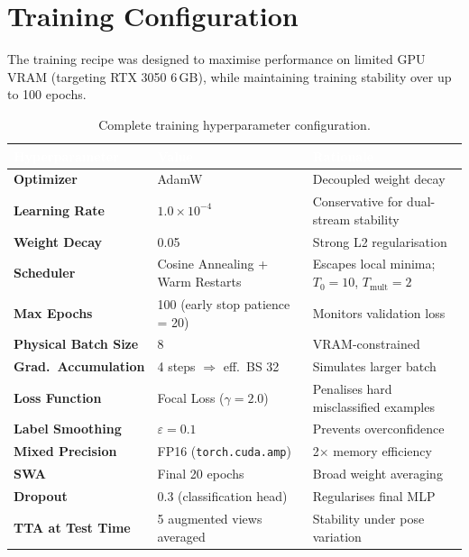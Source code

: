 \documentclass[12pt, a4paper]{article}
\begin{document}
\section{Training Configuration}

The training recipe was designed to maximise performance on limited GPU VRAM (targeting RTX
3050 6\,GB), while maintaining training stability over up to 100 epochs.

\begin{table}[H]
\centering
\caption{Complete training hyperparameter configuration.}
\label{tab:training}
\begin{tabularx}{\textwidth}{>{\bfseries}lXX}
\toprule
\rowcolor{NavyBlue}
\textcolor{white}{Hyperparameter} &
\textcolor{white}{Value} &
\textcolor{white}{Rationale} \\
\midrule
Optimizer           & AdamW                          & Decoupled weight decay \\
Learning Rate       & $1.0\times10^{-4}$             & Conservative for dual-stream stability \\
Weight Decay        & 0.05                           & Strong L2 regularisation \\
Scheduler           & Cosine Annealing + Warm Restarts & Escapes local minima; $T_0=10$, $T_\text{mult}=2$ \\
Max Epochs          & 100 (early stop patience = 20) & Monitors validation loss \\
Physical Batch Size & 8                              & VRAM-constrained \\
Grad.\ Accumulation & 4 steps $\Rightarrow$ eff.\ BS 32 & Simulates larger batch \\
Loss Function       & Focal Loss ($\gamma=2.0$)      & Penalises hard misclassified examples \\
Label Smoothing     & $\varepsilon=0.1$              & Prevents overconfidence \\
Mixed Precision     & FP16 (\texttt{torch.cuda.amp}) & 2$\times$ memory efficiency \\
SWA                 & Final 20 epochs                & Broad weight averaging \\
Dropout             & 0.3 (classification head)      & Regularises final MLP \\
TTA at Test Time    & 5 augmented views averaged     & Stability under pose variation \\
\bottomrule
\end{tabularx}
\end{table}
\end{document}
